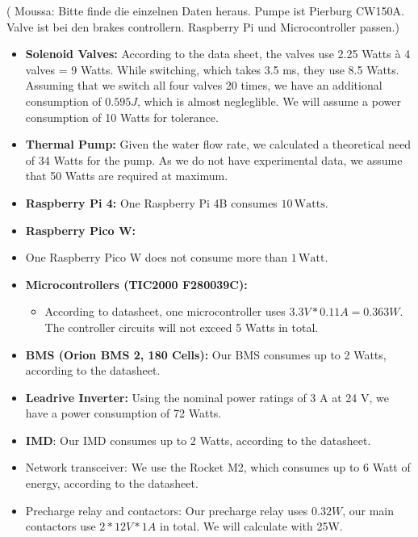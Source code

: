 ( Moussa: Bitte finde die einzelnen Daten heraus. Pumpe ist Pierburg CW150A. Valve ist bei den brakes controllern. Raspberry Pi und Microcontroller passen.)
\begin{itemize}
    \item \textbf{Solenoid Valves:} According to the data sheet, the valves use 2.25 Watts à 4 valves = 9 Watts. While switching, which takes 3.5 ms, they use 8.5 Watts.
    Assuming that we switch all four valves 20 times, we have an additional consumption of \(0.595 J\), which is almost negleglible. We will assume a power consumption of 10 Watts for tolerance.
    \item \textbf{Thermal Pump:} Given the water flow rate, we calculated a theoretical need of 34 Watts for the pump. As we do not have experimental data, we assume that 50 Watts are required at maximum.
    
    \item \textbf{Raspberry Pi 4:} One Raspberry Pi 4B consumes \(10 \, \text{Watts}\).
    \item \textbf{Raspberry Pico W:}
    \item One Raspberry Pico W does not consume more than \(1 \, \text{Watt}\). 

    \item \textbf{Microcontrollers (TIC2000 F280039C):}
    \begin{itemize}
        \item According to datasheet, one microcontroller uses \(3.3V * 0.11 A = 0.363 W \). The controller circuits will not exceed 5 Watts in total. 
    \end{itemize}

    \item \textbf{BMS (Orion BMS 2, 180 Cells):}
       Our BMS consumes up to 2 Watts, according to the datasheet.

    \item \textbf{Leadrive Inverter:} Using the nominal power ratings of 3 A at 24 V, we have a power consumption of 72 Watts.
    \item \textbf{IMD}: Our IMD consumes up to 2 Watts, according to the datasheet.
    \item Network transceiver: We use the Rocket M2, which consumes up to 6 Watt of energy, according to the datasheet.
    \item Precharge relay and contactors: Our precharge relay uses \(0.32 W \), our main contactors use \(2 * 12V * 1A\) in total. We will calculate with 25W.
\end{itemize}

